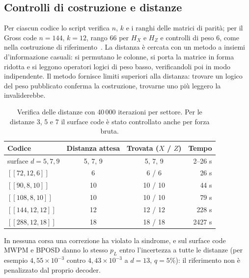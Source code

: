 \begin{onehalfspace}
\subsection{Controlli di costruzione e distanze}
\label{app:gross_controlli}

Per ciascun codice lo script verifica $n$, $k$ e i ranghi delle matrici
di parità; per il Gross code $n = 144$, $k = 12$, rango 66 per $H_X$ e
$H_Z$ e controlli di peso 6, come nella costruzione di
riferimento~\cite{bravyi2024}. La distanza è cercata con un metodo a
insiemi d'informazione casuali: si permutano le colonne, si porta la
matrice in forma ridotta e si leggono operatori logici di peso basso,
verificandoli poi in modo indipendente. Il metodo fornisce limiti
superiori alla distanza: trovare un logico del peso pubblicato conferma
la costruzione, trovarne uno più leggero la invaliderebbe.

\begin{table}[H]

\centering
\small
\begin{tabular}{@{}lccr@{}}
\toprule
\textbf{Codice} & \textbf{Distanza attesa} & \textbf{Trovata ($X$ / $Z$)} & \textbf{Tempo} \\
\midrule
surface $d = 5, 7, 9$ & 5, 7, 9 & 5, 7, 9 & 2--26 s \\
\addlinespace[0.3em]
$[[72,12,6]]$ & 6 & 6 / 6 & 26 s \\
\addlinespace[0.3em]
$[[90,8,10]]$ & 10 & 10 / 10 & 44 s \\
\addlinespace[0.3em]
$[[108,8,10]]$ & 10 & 10 / 10 & 79 s \\
\addlinespace[0.3em]
$[[144,12,12]]$ & 12 & 12 / 12 & 228 s \\
\addlinespace[0.3em]
$[[288,12,18]]$ & 18 & 18 / 18 & 2427 s \\
\bottomrule
\end{tabular}
\caption[Distanze dei codici bivariate bicycle]{Verifica delle distanze
con 40\,000 iterazioni per settore. Per le distanze 3, 5 e 7 il surface
code è stato controllato anche per forza bruta.}\label{tab:app_gross_distanze}

\end{table}

In nessuna corsa una correzione ha violato la sindrome, e sul surface
code \ac{MWPM} e \ac{BPOSD} danno lo stesso $p_L$ entro l'incertezza a
tutte le distanze (per esempio $4{,}55\times10^{-3}$ contro
$4{,}43\times10^{-3}$ a $d = 13$, $q = 5\%$): il riferimento non è
penalizzato dal proprio decoder.


\end{onehalfspace}
